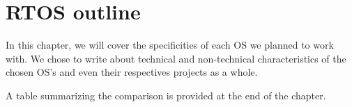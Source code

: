 \chapter{RTOS outline}

In this chapter, we will cover the specificities of each OS we planned to work with.
We chose to write about technical and non-technical characteristics of the chosen OS's and even their respectives projects as a whole.


A table summarizing the comparison is provided at the end of the chapter.






